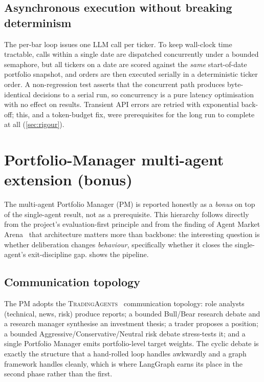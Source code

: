 \subsection{Asynchronous execution without breaking determinism}

The per-bar loop issues one LLM call per ticker. To keep wall-clock time tractable, calls
within a single date are dispatched concurrently under a bounded semaphore, but all tickers
on a date are scored against the \emph{same} start-of-date portfolio snapshot, and orders
are then executed serially in a deterministic ticker order. A non-regression test asserts
that the concurrent path produces byte-identical decisions to a serial run, so concurrency
is a pure latency optimisation with no effect on results. Transient API errors are retried
with exponential back-off; this, and a token-budget fix, were prerequisites for the long run
to complete at all (\cref{sec:rigour}).

\section{Portfolio-Manager multi-agent extension (bonus)}
\label{sec:pm}

The multi-agent Portfolio Manager (PM) is reported honestly as a \emph{bonus} on top of the
single-agent result, not as a prerequisite. This hierarchy follows directly from the
project's evaluation-first principle and from the finding of Agent Market
Arena~\cite{ama2025} that architecture matters more than backbone: the interesting question
is whether deliberation changes \emph{behaviour}, specifically whether it closes the
single-agent's exit-discipline gap.  shows the pipeline.



\subsection{Communication topology}

The PM adopts the \textsc{TradingAgents}~\cite{tradingagents2024} communication topology:
role analysts (technical, news, risk) produce reports; a bounded Bull/Bear research debate
and a research manager synthesise an investment thesis; a trader proposes a position; a
bounded Aggressive/Conservative/Neutral risk debate stress-tests it; and a single Portfolio
Manager emits portfolio-level target weights. The cyclic debate is exactly the structure
that a hand-rolled loop handles awkwardly and a graph framework handles cleanly, which is
where LangGraph earns its place in the second phase rather than the first.


